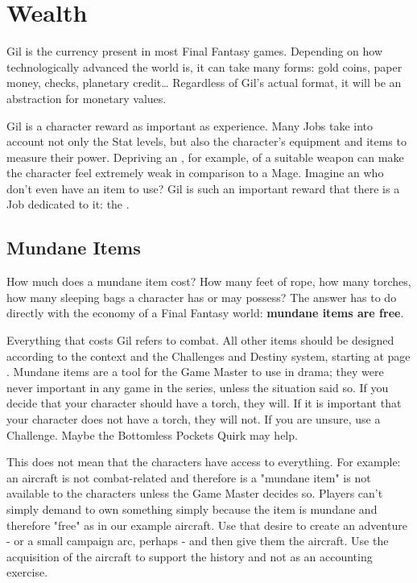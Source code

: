 \label{ch:inventory}

\section{Wealth}

\begin{multicols}{2}
\label{sec:inv-wealth}
Gil is the currency present in most Final Fantasy games. Depending on how technologically advanced the world is, it can take many forms: gold coins, paper money, checks, planetary credit\ldots{} Regardless of Gil’s actual format, it will be an abstraction for monetary values.

Gil is a character reward as important as experience. Many Jobs take into account not only the Stat levels, but also the character’s equipment and items to measure their power. Depriving an , for example, of a suitable weapon can make the character feel extremely weak in comparison to a Mage. Imagine an  who don’t even have an item to use? Gil is such an important reward that there is a Job dedicated to it: the .

\subsection{Mundane Items}
\label{subsec:inv-mundane}
How much does a mundane item cost? How many feet of rope, how many torches, how many sleeping bags a character has or may possess? The answer has to do directly with the economy of a Final Fantasy world: \textbf{mundane items are free}.

Everything that costs Gil refers to combat. All other items should be designed according to the context and the Challenges and Destiny system, starting at page \pageref{ch:engine}. Mundane items are a tool for the Game Master to use in drama; they were never important in any game in the series, unless the situation said so. If you decide that your character should have a torch, they will. If it is important that your character does not have a torch, they will not. If you are unsure, use a Challenge. Maybe the Bottomless Pockets Quirk may help.

This does not mean that the characters have access to everything. For example: an aircraft is not combat-related and therefore is a "mundane item" is not available to the characters unless the Game Master decides so. Players can’t simply demand to own something simply because the item is mundane and therefore "free" as in our example aircraft. Use that desire to create an adventure - or a small campaign arc, perhaps - and then give them the aircraft. Use the acquisition of the aircraft to support the history and not as an accounting exercise.


\end{multicols}
